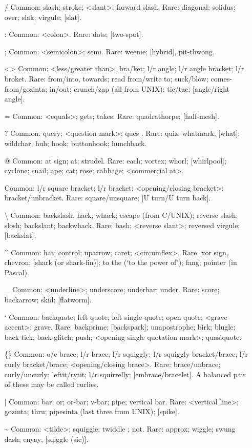 \documentclass[10pt,twoside,openright]{memoir}
\begin{document}
\begin{itemize}
\item[{\ttfamily /}] Common: slash; stroke; <slant>; forward slash. Rare: diagonal; solidus; over; slak; virgule; [slat].
\item[{\ttfamily :}] Common: <colon>. Rare: dots; [two-spot].
\item[{\ttfamily ;}] Common: <semicolon>; semi. Rare: weenie; [hybrid], pit-thwong.
\item[{\ttfamily <>}] Common: <less/greater than>; bra/ket; l/r angle; l/r angle bracket; l/r broket. Rare: from/{into, towards}; read from/write to; suck/blow; comes-from/gozinta; in/out; crunch/zap (all from UNIX); tic/tac; [angle/right angle].
\item[{\ttfamily =}] Common: <equals>; gets; takes. Rare: quadrathorpe; [half-mesh].
\item[{\ttfamily ?}] Common: query; <question mark>; ques . Rare: quiz; whatmark; [what]; wildchar; huh; hook; buttonhook; hunchback.
\item[{\ttfamily @}] Common: at sign; at; strudel. Rare: each; vortex; whorl; [whirlpool]; cyclone; snail; ape; cat; rose; cabbage; <commercial at>.
\item[{\ttfamily []}] Common: l/r square bracket; l/r bracket; <opening/closing bracket>; bracket/unbracket. Rare: square/unsquare; [U turn/U turn back].
\item[{\ttfamily \textbackslash}] Common: backslash, hack, whack; escape (from C/UNIX); reverse slash; slosh; backslant; backwhack. Rare: bash; <reverse slant>; reversed virgule; [backslat].
\item[{\ttfamily \textasciicircum}] Common: hat; control; uparrow; caret; <circumflex>. Rare: xor sign, chevron; [shark (or shark-fin)]; to the (`to the power of'); fang; pointer (in Pascal).
\item[{\ttfamily \_}] Common: <underline>; underscore; underbar; under. Rare: score; backarrow; skid; [flatworm].
\item[{\ttfamily `}] Common: backquote; left quote; left single quote; open quote; <grave accent>; grave. Rare: backprime; [backspark]; unapostrophe; birk; blugle; back tick; back glitch; push; <opening single quotation mark>; quasiquote.
\item[{\ttfamily \{\}}] Common: o/c brace; l/r brace; l/r squiggly; l/r squiggly bracket/brace; l/r curly bracket/brace; <opening/closing brace>. Rare: brace/unbrace; curly/uncurly; leftit/rytit; l/r squirrelly; [embrace/bracelet]. A balanced pair of these may be called curlies.
\item[{\ttfamily |}] Common: bar; or; or-bar; v-bar; pipe; vertical bar. Rare: <vertical line>; gozinta; thru; pipesinta (last three from UNIX); [spike].
\item[{\ttfamily \textasciitilde}] Common: <tilde>; squiggle; twiddle ; not. Rare: approx; wiggle; swung dash; enyay; [sqiggle (sic)].

\end{itemize}
  
\end{document}

